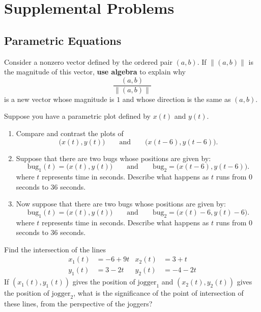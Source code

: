 \newpage

\section{Supplemental Problems}

\subsection{Parametric Equations}


\begin{prob} 
Consider a nonzero vector defined by the ordered pair $(a,b)$. If $\|
(a,b)\|$ is the magnitude of this vector, \textbf{use algebra} to
explain why
\[
\frac{(a,b)}{\|(a,b)\|}
\]
is a new vector whose magnitude is $1$ and whose direction is the same
as $(a,b)$.
\end{prob} 

\begin{prob}
Suppose you have a parametric plot defined by $x(t)$ and $y(t)$.
\begin{enumerate}
\item Compare and contrast the plots of
\[
\bigg(x(t),y(t)\bigg)\qquad\text{and}\qquad\bigg(x(t-6),y(t-6)\bigg).
\]
\item Suppose that there are two bugs whose positions are given by:
\[
\mathrm{bug}_1(t) = \bigg(x(t),y(t)\bigg)\qquad\text{and}\qquad\mathrm{bug}_2=\bigg(x(t-6),y(t-6)\bigg).
\]
where $t$ represents time in seconds. Describe what happens as $t$
runs from $0$ seconds to $36$ seconds.

\item Now suppose that there are two bugs whose positions are given
  by:
\[
\mathrm{bug}_1(t) = \bigg(x(t),y(t)\bigg)\qquad\text{and}\qquad\mathrm{bug}_2=\bigg(x(t)-6,y(t)-6\bigg).
\]
where $t$ represents time in seconds. Describe what happens as $t$
runs from $0$ seconds to $36$ seconds.
\end{enumerate}
\end{prob} 

\begin{prob}
Find the intersection of the lines
\begin{align*}
x_1(t) &= -6 + 9t & x_2(t) &= 3+t \\
y_1(t) &= 3-2t &  y_2(t) &= -4-2t 
\end{align*}
If $(x_1(t),y_1(t))$ gives the position of $\mathrm{jogger}_1$ and
$(x_2(t),y_2(t))$ gives the position of $\mathrm{jogger}_2$, what is
the significance of the point of intersection of these lines, from the
perspective of the joggers?
\end{prob}

